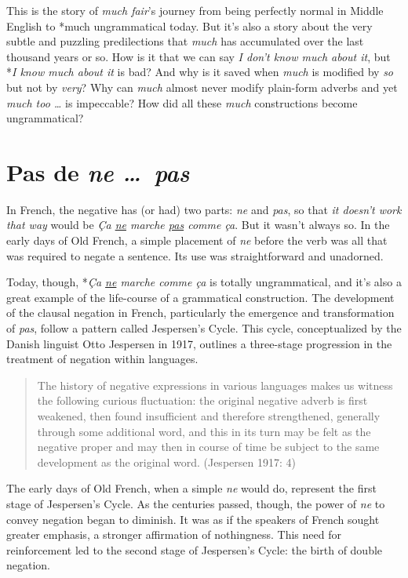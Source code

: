 This is the story of \textit{much fair}'s journey from being perfectly normal in Middle English to *much ungrammatical today. But it's also a story about the very subtle and puzzling predilections that \textit{much} has accumulated over the last thousand years or so. How is it that we can say \textit{I don't know much about it}, but *\textit{I know much about it} is bad? And why is it saved when \textit{much} is modified by \textit{so} but not by \textit{very}? Why can \textit{much} almost never modify plain-form adverbs and yet \textit{much too \dots} is impeccable? How did all these \textit{much} constructions become ungrammatical?

\section{Pas de \textit{ne \dots~pas}}

In French, the negative has (or had) two parts: \textit{ne} and \textit{pas}, so that \textit{it doesn't work that way} would be \textit{Ça \uline{ne} marche \uline{pas} comme ça}. But it wasn't always so. In the early days of Old French, a simple placement of \textit{ne} before the verb was all that was required to negate a sentence. Its use was straightforward and unadorned. 

Today, though, *\textit{Ça \uline{ne} marche comme ça} is totally ungrammatical, and it's also a great example of the life-course of a grammatical construction. The development of the clausal negation in French, particularly the emergence and transformation of \textit{pas}, follow a pattern called Jespersen's Cycle. This cycle, conceptualized by the Danish linguist Otto Jespersen in 1917, outlines a three-stage progression in the treatment of negation within languages.

\begin{quote}
    The history of negative expressions in various languages makes us witness the following curious fluctuation: the original negative adverb is first weakened, then found insufficient and therefore strengthened, generally through some additional word, and this in its turn may be felt as the negative proper and may then in course of time be subject to the same development as the original word.
(Jespersen 1917: 4)
\end{quote}


The early days of Old French, when a simple \textit{ne} would do, represent the first stage of Jespersen's Cycle. As the centuries passed, though, the power of \textit{ne} to convey negation began to diminish. It was as if the speakers of French sought greater emphasis, a stronger affirmation of nothingness. This need for reinforcement led to the second stage of Jespersen's Cycle: the birth of double negation.

